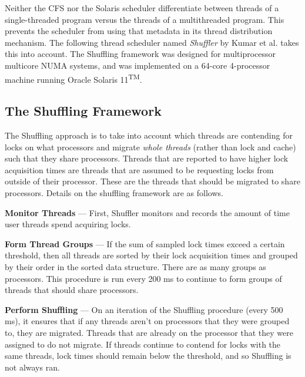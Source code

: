 \documentclass{sig-alternate}
\begin{document}
Neither the CFS nor the Solaris scheduler differentiate between threads of a single-threaded program versus the threads of a multithreaded program. This prevents the scheduler from using that metadata in its thread distribution mechanism. The following thread scheduler named \emph{Shuffler} by Kumar et al. takes this into account. The Shuffling framework was designed for multiprocessor multicore NUMA systems, and was implemented on a 64-core 4-processor machine running Oracle Solaris 11\textsuperscript{TM}.~\cite{Kumar:2014}

\subsection{The Shuffling Framework}

The Shuffling approach is to take into account which threads are contending for locks on what processors and migrate \textit{whole threads} (rather than lock and cache) such that they share processors. Threads that are reported to have higher lock acquisition times are threads that are assumed to be requesting locks from outside of their processor. These are the threads that should be migrated to share processors. Details on the shuffling framework are as follows.

\textbf{Monitor Threads} --- First, Shuffler monitors and records the amount of time user threads spend acquiring locks.

\vspace{1 mm}

\textbf{Form Thread Groups} --- If the sum of sampled lock times exceed a certain threshold, then all threads are sorted by their lock acquisition times and grouped by their order in the sorted data structure. There are as many groups as processors. This procedure is run every 200 ms to continue to form groups of threads that should share processors.

\vspace{1 mm}

\textbf{Perform Shuffling} --- On an iteration of the Shuffling procedure (every 500 ms), it ensures that if any threads aren't on processors that they were grouped to, they are migrated. Threads that are already on the processor that they were assigned to do not migrate. If threads continue to contend for locks with the same threads, lock times should remain below the threshold, and so Shuffling is not always ran.~\cite{Kumar:2014}

\vspace{1 mm}
\end{document}
